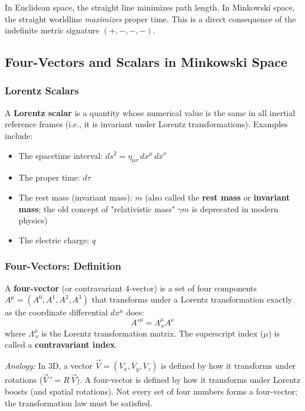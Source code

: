 In Euclidean space, the straight line minimizes path length. In Minkowski space, the straight worldline \emph{maximizes} proper time. This is a direct consequence of the indefinite metric signature $(+,-,-,-)$.

\subsection{Four-Vectors and Scalars in Minkowski Space}

\subsubsection*{Lorentz Scalars}

A \textbf{Lorentz scalar} is a quantity whose numerical value is the same in all inertial reference frames (i.e., it is invariant under Lorentz transformations). Examples include:
\begin{itemize}
    \item The spacetime interval: $ds^2 = \eta_{\mu\nu}\,dx^\mu\,dx^\nu$
    \item The proper time: $d\tau$
    \item The rest mass (invariant mass): $m$ (also called the \textbf{rest mass} or \textbf{invariant mass}; the old concept of "relativistic mass" $\gamma m$ is deprecated in modern physics)
    \item The electric charge: $q$
\end{itemize}

\subsubsection*{Four-Vectors: Definition}

A \textbf{four-vector} (or contravariant 4-vector) is a set of four components $A^\mu = (A^0, A^1, A^2, A^3)$ that transforms under a Lorentz transformation exactly as the coordinate differential $dx^\mu$ does:
\begin{equation}\label{eq:lec05:four-vector-transform}
    A'^\mu = \Lambda^\mu_{\ \nu} A^\nu
\end{equation}
where $\Lambda^\mu_{\ \nu}$ is the Lorentz transformation matrix. The superscript index ($\mu$) is called a \textbf{contravariant index}.

\textit{Analogy:} In 3D, a vector $\vec{V} = (V_x, V_y, V_z)$ is defined by how it transforms under rotations ($\vec{V}\,' = R\,\vec{V}$). A four-vector is defined by how it transforms under Lorentz boosts (and spatial rotations). Not every set of four numbers forms a four-vector; the transformation law must be satisfied.

